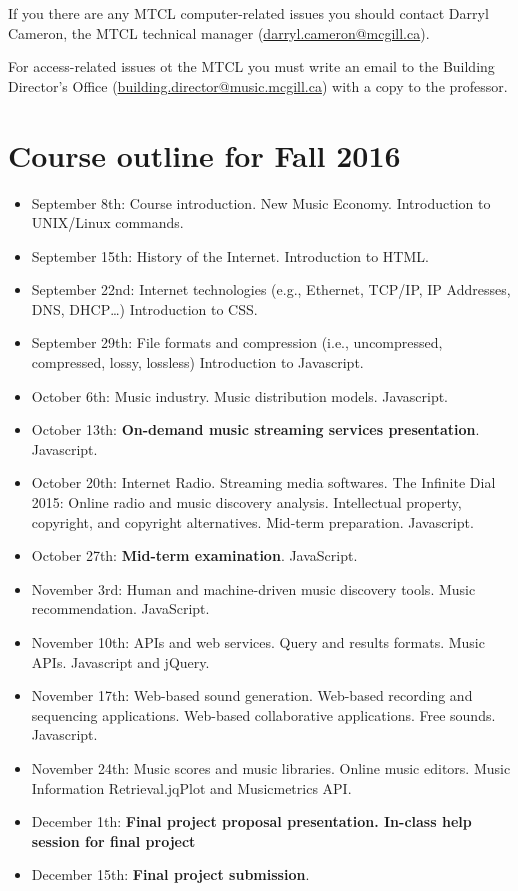 \documentclass[11pt]{amsart}
\begin{document}
If you there are any MTCL computer-related issues you should contact Darryl Cameron, the MTCL technical manager (\href{mailto:darryl.cameron@mcgill.ca}{darryl.cameron@mcgill.ca}). 

For access-related issues ot the MTCL you must write an email to the Building Director's Office (\href{mailto:building.director@music.mcgill.ca}{building.director@music.mcgill.ca}) with a copy to the professor. 






\section{Course outline for Fall 2016}
\begin{itemize}
\item September 8th: Course introduction. New Music Economy. Introduction to UNIX/Linux commands. 
\item September 15th: History of the Internet. Introduction to HTML.\@
\item September 22nd: Internet technologies (e.g., Ethernet, TCP/IP, IP Addresses, DNS, DHCP\ldots) Introduction to CSS.\@
\item September 29th: File formats and compression (i.e., uncompressed, compressed, lossy, lossless) Introduction to Javascript.
\item October 6th: Music industry. Music distribution models. Javascript.
\item October 13th: \textbf{On-demand music streaming services presentation}. Javascript.
\item October 20th: Internet Radio. Streaming media softwares. The Infinite Dial 2015: Online radio and music discovery analysis. Intellectual property, copyright, and copyright alternatives. Mid-term preparation. Javascript.
\item October 27th: \textbf{Mid-term examination}. JavaScript.
\item November 3rd: Human and machine-driven music discovery tools. Music recommendation. JavaScript.
\item November 10th: APIs and web services. Query and results formats. Music APIs. Javascript and jQuery.
\item November 17th: Web-based sound generation. Web-based recording and sequencing applications. Web-based collaborative applications. Free sounds. Javascript.


\item November 24th: Music scores and music libraries. Online music editors. Music Information Retrieval.\@ jqPlot and Musicmetrics API.\@

\item December 1th: \textbf{Final project proposal presentation. In-class help session for final project}
\item December 15th: \textbf{Final project submission}.
\end{itemize}
\end{document}
